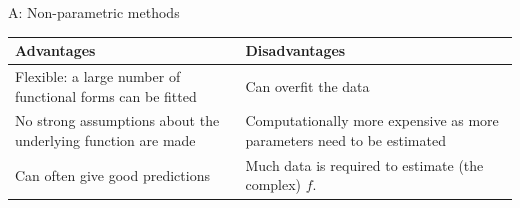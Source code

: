 \documentclass[ignorenonframetext,]{beamer}
\begin{document}
\begin{frame}

\begin{block}{A: Non-parametric methods}

\begin{longtable}[]{@{}ll@{}}
\toprule
\begin{minipage}[b]{0.47\columnwidth}\raggedright\strut
Advantages\strut
\end{minipage} & \begin{minipage}[b]{0.47\columnwidth}\raggedright\strut
Disadvantages\strut
\end{minipage}\tabularnewline
\midrule
\endhead
\begin{minipage}[t]{0.47\columnwidth}\raggedright\strut
Flexible: a large number of functional forms can be fitted\strut
\end{minipage} & \begin{minipage}[t]{0.47\columnwidth}\raggedright\strut
Can overfit the data\strut
\end{minipage}\tabularnewline
\begin{minipage}[t]{0.47\columnwidth}\raggedright\strut
No strong assumptions about the underlying function are made\strut
\end{minipage} & \begin{minipage}[t]{0.47\columnwidth}\raggedright\strut
Computationally more expensive as more parameters need to be
estimated\strut
\end{minipage}\tabularnewline
\begin{minipage}[t]{0.47\columnwidth}\raggedright\strut
Can often give good predictions\strut
\end{minipage} & \begin{minipage}[t]{0.47\columnwidth}\raggedright\strut
Much data is required to estimate (the complex) \(f\).\strut
\end{minipage}\tabularnewline
\bottomrule
\end{longtable}

\end{block}

\end{frame}
\end{document}
